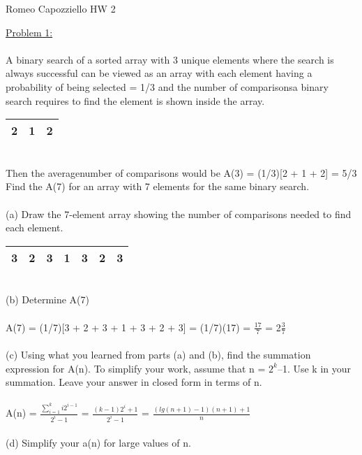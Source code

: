 \documentclass{article}
\begin{document}
    \begin{center}
        Romeo Capozziello HW 2
    \end{center}
    \underline{Problem 1:}\\\\
    A binary search of a sorted array with 3 unique elements where the search is always successful can be viewed as an array with each element having a probability of being selected = 1/3 and the number of comparisonsa binary search requires to find the element is shown inside the array.
    \begin{table}[h]
        \begin{tabular}{| c | c | c |} \hline
            2 & 1 & 2 \\ \hline    
        \end{tabular}
    \end{table}
    \\
    Then the averagenumber of comparisons would be  A(3)  =  (1/3)[2 + 1 + 2] = 5/3\\
    Find the A(7) for an array with 7 elements for the same binary search.\\
    \\
    (a) Draw the 7-element array showing the number of comparisons needed to find each element.
    \begin{table}[h]
        \begin{tabular}{| c | c | c | c | c | c | c |} \hline
            3 & 2 & 3 & 1 & 3 & 2 & 3 \\ \hline    
        \end{tabular}
    \end{table}
    \\
    (b) Determine A(7)\\
    \\
    \indent A(7) = (1/7)[3 + 2 + 3 + 1 + 3 + 2 + 3] = (1/7)(17) = $\frac{17}{7}$ = 2$\frac{3}{7}$\\
    \\
    (c) Using what you learned from parts (a) and (b), find the summation expression for A(n). To simplify your work, assume that n = $2^k$–1. Use k in your summation. Leave your answer in closed form in terms of n. \\
    \\
    \indent A(n) = $\frac{\sum_{i = 1}^{k} i2^{i-1}}{2^i-1}$ = $\frac{(k-1)2^i+1}{2^i-1}$ = $\frac{(lg(n+1)-1)(n+1)+1}{n}$\\
    \\
    (d) Simplify your a(n) for large values of n.\\
\end{document}
